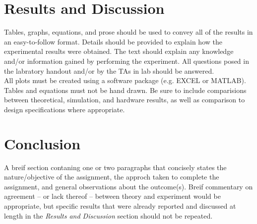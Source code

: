 \documentclass[11pt]{article}
\begin{document}
	\section{Results and Discussion}
	Tables, graphs, equations, and prose should be used to convey all of the
	results in an easy-to-follow format. Details should be provided to 
	explain how the experimental results were obtained. The text should 
	explain any knowledge and/or information gained by performing the experiment.
	All questions posed in the labratory handout and/or by the TAs in lab should
	be answered.\\
	\hfill \break
	All plots must be created using a software package (e.g. EXCEL or MATLAB).
	Tables and equations must not be hand drawn. Be sure to include comparisions
	between theoretical, simulation, and hardware results, as well as
	comparison to design specifications where appropriate.

	\section{Conclusion}
	A breif section contaning one or two paragraphs that concisely states the
	nature/objective of the assignment, the approch taken to complete the
	assignment, and general observations about the outcome(s). Breif commentary
	on agreement -- or lack thereof -- between theory and experiment would be 
	appropriate, but specific results that were already reported and discussed
	at length in the \textit{Results and Discussion} section should not be 
	repeated.
\end{document}
